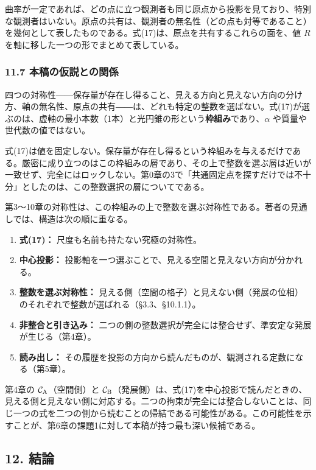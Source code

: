 \documentclass[
  a4paper,
]{ltjsarticle}
\providecommand{\tightlist}{%
  \setlength{\itemsep}{0pt}\setlength{\parskip}{0pt}}
\begin{document}
曲率が一定であれば、どの点に立つ観測者も同じ原点から投影を見ており、特別な観測者はいない。原点の共有は、観測者の無名性（どの点も対等であること）を幾何として表したものである。式(17)は、原点を共有するこれらの面を、値
\(R\) を軸に移した一つの形でまとめて表している。

\subsubsection{11.7
本稿の仮説との関係}\label{ux672cux7a3fux306eux4eeeux8aacux3068ux306eux95a2ux4fc2}

四つの対称性――保存量が存在し得ること、見える方向と見えない方向の分け方、軸の無名性、原点の共有――は、どれも特定の整数を選ばない。式(17)が選ぶのは、虚軸の最小本数（1本）と光円錐の形という\textbf{枠組み}であり、\(\alpha\)
や質量や世代数の値ではない。

式(17)は値を固定しない。保存量が存在し得るという枠組みを与えるだけである。厳密に成り立つのはこの枠組みの層であり、その上で整数を選ぶ層は近いが一致せず、完全にはロックしない。第0章の3で「共通固定点を探すだけでは不十分」としたのは、この整数選択の層についてである。

第3〜10章の対称性は、この枠組みの上で整数を選ぶ対称性である。著者の見通しでは、構造は次の順に重なる。

\begin{enumerate}
\def\labelenumi{\arabic{enumi}.}
\tightlist
\item
  \textbf{式(17)：} 尺度も名前も持たない究極の対称性。
\item
  \textbf{中心投影：}
  投影軸を一つ選ぶことで、見える空間と見えない方向が分かれる。
\item
  \textbf{整数を選ぶ対称性：}
  見える側（空間の格子）と見えない側（発展の位相）のそれぞれで整数が選ばれる（§3.3、§10.1.1）。
\item
  \textbf{非整合と引き込み：}
  二つの側の整数選択が完全には整合せず、準安定な発展が生じる（第4章）。
\item
  \textbf{読み出し：}
  その履歴を投影の方向から読んだものが、観測される定数になる（第5章）。
\end{enumerate}

第4章の \(\mathcal C_{\rm A}\)（空間側）と
\(\mathcal C_{\rm B}\)（発展側）は、式(17)を中心投影で読んだときの、見える側と見えない側に対応する。二つの拘束が完全には整合しないことは、同じ一つの式を二つの側から読むことの帰結である可能性がある。この可能性を示すことが、第6章の課題1に対して本稿が持つ最も深い候補である。

\subsection{12. 結論}\label{ux7d50ux8ad6}
\end{document}
